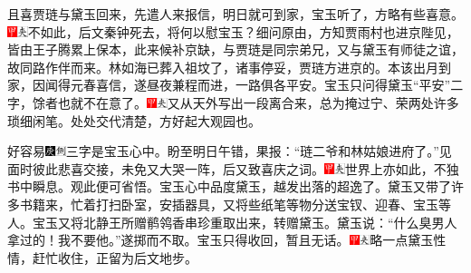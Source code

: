 且喜贾琏与黛玉回来，先遣人来报信，明日就可到家，宝玉听了，方略有些喜意。{\includegraphics[width=3mm]{../Images/00002}\includegraphics[width=3mm]{../Images/00012}\footnotesize \kaishu 不如此，后文秦钟死去，将何以慰宝玉？}细问原由，方知贾雨村也进京陛见，皆由王子腾累上保本，此来候补京缺，与贾琏是同宗弟兄，又与黛玉有师徒之谊，故同路作伴而来。林如海已葬入祖坟了，诸事停妥，贾琏方进京的。本该出月到家，因闻得元春喜信，遂昼夜兼程而进，一路俱各平安。宝玉只问得黛玉``平安''二字，馀者也就不在意了。{\includegraphics[width=3mm]{../Images/00002}\includegraphics[width=3mm]{../Images/00012}\footnotesize \kaishu 又从天外写出一段离合来，总为掩过宁、荣两处许多琐细闲笔。处处交代清楚，方好起大观园也。}

好容易{\includegraphics[width=3mm]{../Images/00004}\includegraphics[width=3mm]{../Images/00011}\footnotesize \kaishu 三字是宝玉心中。}盼至明日午错，果报：``琏二爷和林姑娘进府了。''见面时彼此悲喜交接，未免又大哭一阵，后又致喜庆之词。{\includegraphics[width=3mm]{../Images/00002}\includegraphics[width=3mm]{../Images/00012}\footnotesize \kaishu 世界上亦如此，不独书中瞬息。观此便可省悟。}宝玉心中品度黛玉，越发出落的超逸了。黛玉又带了许多书籍来，忙着打扫卧室，安插器具，又将些纸笔等物分送宝钗、迎春、宝玉等人。宝玉又将北静王所赠鹡鸰香串珍重取出来，转赠黛玉。黛玉说：``什么臭男人拿过的！我不要他。''遂掷而不取。宝玉只得收回，暂且无话。{\includegraphics[width=3mm]{../Images/00002}\includegraphics[width=3mm]{../Images/00012}\footnotesize \kaishu 略一点黛玉性情，赶忙收住，正留为后文地步。}

